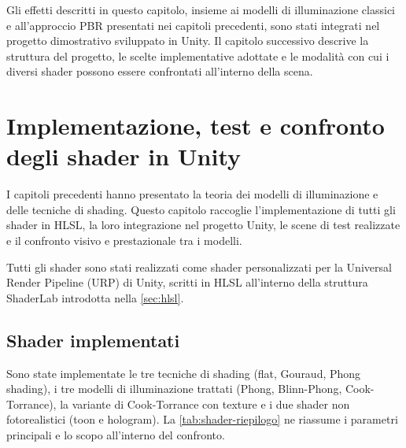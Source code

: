 \documentclass[12pt,a4paper,twoside]{book}
\begin{document}
Gli effetti descritti in questo capitolo, insieme ai modelli di illuminazione classici e all'approccio PBR presentati nei capitoli precedenti, sono stati integrati nel progetto dimostrativo sviluppato in Unity. Il capitolo successivo descrive la struttura del progetto, le scelte implementative adottate e le modalità con cui i diversi shader possono essere confrontati all'interno della scena.


\chapter{Implementazione, test e confronto degli shader in Unity} \label{chap:progetto}

I capitoli precedenti hanno presentato la teoria dei modelli di illuminazione e delle tecniche di shading. Questo capitolo raccoglie l'implementazione di tutti gli shader in HLSL, la loro integrazione nel progetto Unity, le scene di test realizzate e il confronto visivo e prestazionale tra i modelli.

Tutti gli shader sono stati realizzati come shader personalizzati per la Universal Render Pipeline (URP) di Unity, scritti in HLSL all'interno della struttura ShaderLab introdotta nella \cref{sec:hlsl}.

\section{Shader implementati}
\label{sec:shader-implementati}

Sono state implementate le tre tecniche di shading (flat, Gouraud, Phong shading), i tre modelli di illuminazione trattati (Phong, Blinn-Phong, Cook-Torrance), la variante di Cook-Torrance con texture e i due shader non fotorealistici (toon e hologram). La \cref{tab:shader-riepilogo} ne riassume i parametri principali e lo scopo all'interno del confronto.
\end{document}

